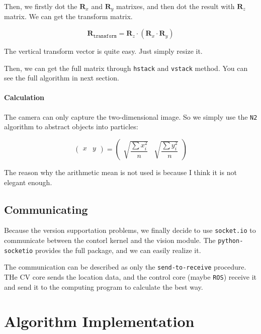\documentclass{article}
\begin{document}
Then, we firstly dot the $\boldsymbol{R}_x$ and $\boldsymbol{R}_y$ matrixes, and then dot the result with $\boldsymbol{R}_z$ matrix. We can get the transform matrix.

\begin{equation}
  \boldsymbol{R}_{\texttt{transform}}=\boldsymbol{R}_z\cdot\left(\boldsymbol{R}_x\cdot\boldsymbol{R}_y\right)
\end{equation}

The vertical transform vector is quite easy. Just simply resize it.

Then, we can get the full matrix through \texttt{hstack} and \texttt{vstack} method. You can see the full algorithm in next section.

\paragraph{Calculation}

The camera can only capture the two-dimensional image. So we simply use the \texttt{N2} algorithm to abstract objects into particles:

\[
  \left(\begin{matrix}x&y\end{matrix}\right)=\left(\begin{matrix}\sqrt{\dfrac{\sum x_i^2}{n}}&\sqrt{\dfrac{\sum y_i^2}{n}}\end{matrix}\right)
\]

The reason why the arithmetic mean is not used is because I think it is not elegant enough.

\subsection{Communicating}

Because the version supportation problems, we finally decide to use \texttt{socket.io} to communicate between the contorl kernel and the vision module. The \texttt{python-socketio} provides the full package, and we can easily realize it.

The communication can be described as only the \texttt{send-to-receive} procedure. THe CV core sends the location data, and the control core (maybe \texttt{ROS}) receive it and send it to the computing program to calculate the best way.

\section{Algorithm Implementation}
\end{document}
